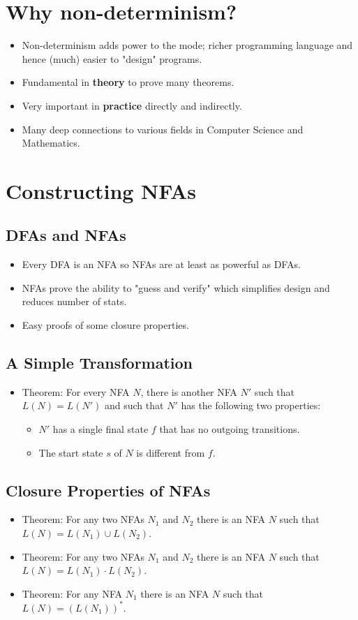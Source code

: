 \documentclass[12pt]{article}
\begin{document}
\section{Why non-determinism?}
\begin{itemize}
    \item Non-determinism adds power to the mode; richer programming language and hence (much) easier to "design" programs.
    \item Fundamental in \textbf{theory} to prove many theorems.
    \item Very important in \textbf{practice} directly and indirectly.
    \item Many deep connections to various fields in Computer Science and Mathematics.
\end{itemize}

\section{Constructing NFAs}

\subsection{DFAs and NFAs}
\begin{itemize}
    \item Every DFA is an NFA so NFAs are at least as powerful as DFAs.
    \item NFAs prove the ability to "guess and verify" which simplifies design and reduces number of stats.
    \item Easy proofs of some closure properties.
\end{itemize}

\subsection{A Simple Transformation}
\begin{itemize}
    \item Theorem: For every NFA $N$, there is another NFA $N'$ such that $L(N) = L(N')$ and such that $N'$ has the following two properties:
    \begin{itemize}
        \item $N'$ has a single final state $f$ that has no outgoing transitions.
        \item The start state $s$ of $N$ is different from $f$.
    \end{itemize}
\end{itemize}

\subsection{Closure Properties of NFAs}
\begin{itemize}
    \item Theorem: For any two NFAs $N_1$ and $N_2$ there is an NFA $N$ such that $L(N) = L(N_1) \cup L(N_2)$.
    \item Theorem: For any two NFAs $N_1$ and $N_2$ there is an NFA $N$ such that $L(N) = L(N_1) \cdot L(N_2)$.
    \item Theorem: For any NFA $N_1$ there is an NFA $N$ such that $L(N) = (L(N_1))^{\ast}$.
\end{itemize}
\end{document}
